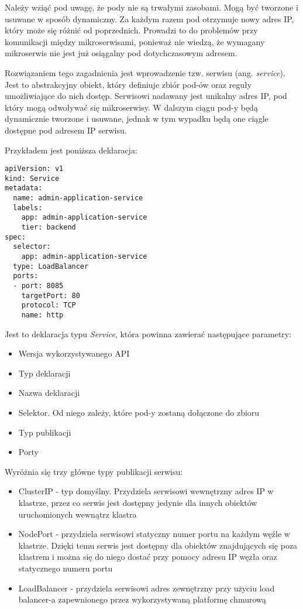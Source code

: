 Należy wziąć pod uwagę, że pody nie są trwałymi zasobami. Mogą być tworzone i usuwane 
w sposób dynamiczny. Za każdym razem pod otrzymuje nowy adres IP, który może się 
różnić od poprzednich. Prowadzi to do problemów przy komunikacji między 
mikroserwisami, ponieważ nie wiedzą, że wymagany mikroserwis nie jest już osiągalny pod 
dotychczasowym adresem.

Rozwiązaniem tego zagadnienia jest wprowadzenie tzw. serwisu (ang. \textit{service}). Jest to abstrakcyjny 
obiekt, który definiuje zbiór pod-ów oraz reguły umożliwiające do nich dostęp. 
Serwisowi nadawany jest unikalny adres IP, pod który mogą odwoływać się mikroserwisy. 
W dalszym ciągu pod-y będą dynamicznie tworzone i usuwane, jednak w tym wypadku będą 
one ciągle dostępne pod adresem IP serwisu.

Przykładem jest poniższa deklaracja:

\begin{lstlisting}
apiVersion: v1
kind: Service
metadata:
  name: admin-application-service
  labels:
    app: admin-application-service
    tier: backend
spec:
  selector:
    app: admin-application-service
  type: LoadBalancer
  ports:
  - port: 8085
    targetPort: 80
    protocol: TCP
    name: http 
\end{lstlisting}

Jest to deklaracja typu \textit{Service}, która powinna zawierać następujące parametry:

\begin{itemize} %
    \item Wersja wykorzystywanego API
    \item Typ deklaracji
    \item Nazwa deklaracji
    \item Selektor. Od niego zależy, które pod-y zostaną dołączone do zbioru
    \item Typ publikacji
    \item Porty
\end{itemize}

Wyróżnia się trzy główne typy publikacji serwisu:

\begin{itemize} %
    \item ClusterIP - typ domyślny. Przydziela serwisowi wewnętrzny adres IP 
    w klastrze, przez co serwis jest dostępny jedynie dla innych obiektów uruchomionych 
    wewnątrz klastra
    \item NodePort - przydziela serwisowi statyczny numer portu na każdym węźle 
    w klastrze. Dzięki temu serwis jest dostępny dla obiektów znajdujących się poza 
    klastrem i można się do niego dostać przy pomocy adresu IP węzła oraz statycznego 
    numeru portu
    \item LoadBalancer - przydziela serwisowi adres zewnętrzny przy użyciu load 
    balancer-a zapewnionego przez wykorzystywaną platformę chmurową
\end{itemize}


